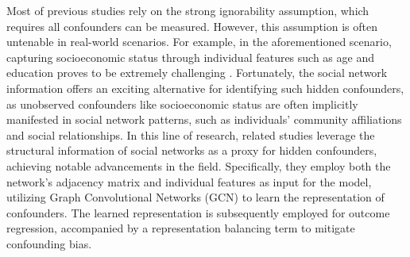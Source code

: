 \documentclass[twoside,leqno,twocolumn]{article}
\begin{document}
Most of previous studies \cite{johansson2016learning,shalit2017estimating,hassanpour2019learning,alaa2017bayesian,hill2011bayesian,li2017matching,wager2018estimation,yao2018representation,schwab1810perfect} rely on the strong ignorability assumption, which requires all confounders can be measured. However, this assumption is often untenable in real-world scenarios. For example, in the aforementioned scenario, capturing socioeconomic status through individual features such as age and education proves to be extremely challenging \cite{guo2020learning}. Fortunately, the social network information offers an exciting alternative for identifying such hidden confounders, as unobserved confounders like socioeconomic status are often implicitly manifested in social network patterns, such as individuals' community affiliations and social relationships. In this line of research, related studies \cite{guo2020learning,guo2021ignite,ma2021deconfounding,chu2021graph,veitch2019using} leverage the structural information of social networks as a proxy for hidden confounders, achieving notable advancements in the field. Specifically, they employ both the network's adjacency matrix and individual features as input for the model, utilizing Graph Convolutional Networks (GCN) to learn the representation of confounders. The learned representation is subsequently employed for outcome regression, accompanied by a representation balancing term to mitigate confounding bias. 
\end{document}
